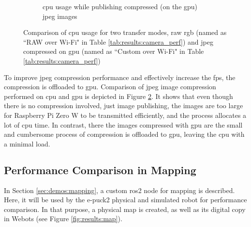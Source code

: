 \begin{figure}[H]
\begin{subfigure}{.8\textwidth}
  \caption{\ac{cpu} usage while publishing compressed (on the \ac{gpu}) \ac{jpeg} images}
  \label{fig:results:camera_load:jpeg_gpu}
\end{subfigure}
\caption[Comparison of \ac{cpu} usage for two transfer modes, raw \ac{rgb} and \ac{jpeg} compressed on \ac{gpu}]{Comparison of \ac{cpu} usage for two transfer modes, raw \ac{rgb} (named as ``RAW over Wi-Fi" in Table \ref{tab:results:camera_perf}) and \ac{jpeg} compressed on \ac{gpu} (named as ``Custom over Wi-Fi" in Table \ref{tab:results:camera_perf})}
\label{fig:results:camera_load}
\end{figure}

To improve \ac{jpeg} compression performance and effectively increase the \ac{fps}, the compression is offloaded to \ac{gpu}.
Comparison of \ac{jpeg} image compression performed on \ac{cpu} and \ac{gpu} is depicted in Figure \ref{fig:results:camera_load}.
It shows that even though there is no compression involved, just image publishing, the images are too large for Raspberry Pi Zero W to be transmitted efficiently, and the process allocates a lot of \ac{cpu} time.
In contrast, there the images compressed with \ac{gpu} are the small and cumbersome process of compression is offloaded to \ac{gpu}, leaving the \ac{cpu} with a minimal load.

\subsection{Performance Comparison in Mapping}
In Section \ref{sec:demos:mapping}, a custom \ac{ros2} node for mapping is described. Here, it will be used by the e-puck2 physical and simulated robot for performance comparison. In that purpose, a physical map is created, as well as its digital copy in Webots (see Figure \ref{fig:results:map}).

